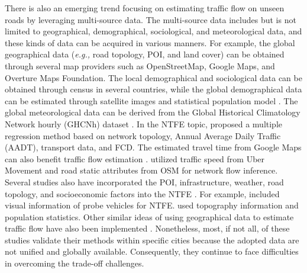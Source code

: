 There is also an emerging trend focusing on estimating traffic flow on unseen roads by leveraging multi-source data. The multi-source data includes but is not limited to geographical, demographical, sociological, and meteorological data, and these kinds of data can be acquired in various manners. For example, the global geographical data (\textit{e.g.,} road topology, POI, and land cover) can be obtained through several map providers such as OpenStreetMap, Google Maps, and Overture Maps Foundation. The local demographical and sociological data can be obtained through census \citep{demo_census} in several countries, while the global demographical data can be estimated through satellite images and statistical population model \citep{pop_map_get01,pop_map_get02}. The global meteorological data can be derived from the Global Historical Climatology Network hourly (GHCNh) dataset \citep{GHCNh}.
In the NTFE topic, \citet{multiple_regression_flow} proposed a multiple regression method based on network topology, Annual Average Daily Traffic (AADT), transport data, and FCD. The estimated travel time from Google Maps can also benefit traffic flow estimation \citep{google_flow}. \citet{open_data_flow_estimation} utilized traffic speed from Uber Movement and road static attributes from OSM for network flow inference. Several studies also have incorporated the POI, infrastructure, weather, road topology, and socioeconomic factors into the NTFE \citep{machine_flow_1, ssl_flow, data_driven_flow, search_flow_estimation}. For example, \citet{vision_flow} included visual information of probe vehicles for NTFE. \citet{flow_topo_pop} used topography information and population statistics. Other similar ideas of using geographical data to estimate traffic flow have also been implemented \citep{transfer_flow_1,gis_flow_1,gis_flow_2}. Nonetheless, most, if not all, of these studies validate their methods within specific cities because the adopted data are not unified and globally available. Consequently, they continue to face difficulties in overcoming the trade-off challenges.